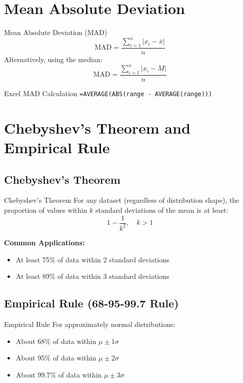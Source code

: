 \documentclass[12pt,a4paper]{book}
\begin{document}
\section{Mean Absolute Deviation}

\begin{definition}{Mean Absolute Deviation (MAD)}
\[
\text{MAD} = \frac{\sum_{i=1}^{n} |x_i - \bar{x}|}{n}
\]
Alternatively, using the median:
\[
\text{MAD} = \frac{\sum_{i=1}^{n} |x_i - M|}{n}
\]
\end{definition}

\begin{example}{Excel MAD Calculation}
\texttt{=AVERAGE(ABS(range - AVERAGE(range)))}
\end{example}

\section{Chebyshev's Theorem and Empirical Rule}

\subsection{Chebyshev's Theorem}

\begin{definition}{Chebyshev's Theorem}
For any dataset (regardless of distribution shape), the proportion of values within $k$ standard deviations of the mean is at least:
\[
1 - \frac{1}{k^2}, \quad k > 1
\]
\end{definition}

\textbf{Common Applications:}
\begin{itemize}
    \item At least 75\% of data within 2 standard deviations
    \item At least 89\% of data within 3 standard deviations
\end{itemize}

\subsection{Empirical Rule (68-95-99.7 Rule)}

\begin{definition}{Empirical Rule}
For approximately normal distributions:
\begin{itemize}
    \item About 68\% of data within $\mu \pm 1\sigma$
    \item About 95\% of data within $\mu \pm 2\sigma$
    \item About 99.7\% of data within $\mu \pm 3\sigma$
\end{itemize}
\end{definition}
\end{document}
